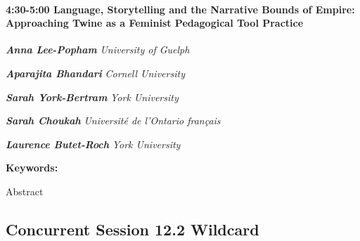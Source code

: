 \documentclass[
]{book}
\begin{document}
\begin{session}
\hypertarget{language-storytelling-and-the-narrative-bounds-of-empire-approaching-twine-as-a-feminist-pedagogical-tool-practice}{%
\paragraph*{\texorpdfstring{4:30-5:00 \textbar{} \textbf{Language,
Storytelling and the Narrative Bounds of Empire: Approaching Twine as a
Feminist Pedagogical Tool} \textbar{}
Practice}{4:30-5:00 \textbar{} Language, Storytelling and the Narrative Bounds of Empire: Approaching Twine as a Feminist Pedagogical Tool \textbar{} Practice}}\label{language-storytelling-and-the-narrative-bounds-of-empire-approaching-twine-as-a-feminist-pedagogical-tool-practice}}

\textbf{\emph{Anna Lee-Popham}} \textbar{} \emph{University of Guelph}

\textbf{\emph{Aparajita Bhandari}} \textbar{} \emph{Cornell University}

\textbf{\emph{Sarah York-Bertram}} \textbar{} \emph{York University}

\textbf{\emph{Sarah Choukah}} \textbar{} \emph{Université de l'Ontario
français}

\textbf{\emph{Laurence Butet-Roch}} \textbar{} \emph{York University}

\textbf{Keywords:}

Abstract
\end{session}

\hypertarget{concurrent-session-12.2-wildcard}{%
\subsection*{Concurrent Session 12.2 \textbar{} Wildcard}\label{concurrent-session-12.2-wildcard}}
\end{document}
